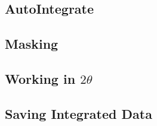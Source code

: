 \subsection{AutoIntegrate}


\subsection{Masking}
\subsection{Working in $2\theta$}
\subsection{Saving Integrated Data}




